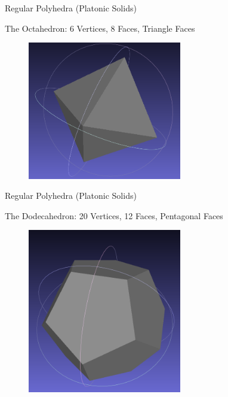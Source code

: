 \documentclass{beamer}
\begin{document}
\begin{frame}{Regular Polyhedra (Platonic Solids)}

The Octahedron: 6 Vertices, 8 Faces, Triangle Faces

\begin{figure}[t]
    \includegraphics[width=0.6\textwidth]{PlatonicSolids/Octahedron.png}
\end{figure}

\end{frame}


\begin{frame}{Regular Polyhedra (Platonic Solids)}

The Dodecahedron: 20 Vertices, 12 Faces, Pentagonal Faces

\begin{figure}[t]
    \includegraphics[width=0.6\textwidth]{PlatonicSolids/Dodecahedron.png}
\end{figure}

\end{frame}
\end{document}
